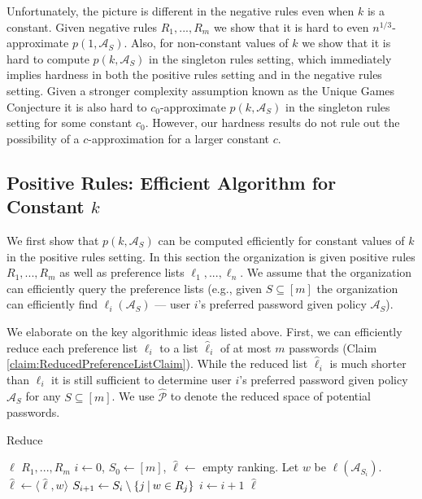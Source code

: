 \documentclass[prodmode,acmec]{ec-acmsmall}
\newcommand{\PasswordSpace}{\mathcal{P}}
\begin{document}
Unfortunately, the picture is different in the negative rules even when $k$ is a constant. Given negative rules $R_1,...,R_m$ we show that it is hard to even $n^{1/3}$-approximate $p\left(1,\mathcal{A}_S\right)$. Also, for non-constant values of $k$ we show that it is hard to compute $p\left(k,\mathcal{A}_S\right)$ in the singleton rules setting, which immediately implies hardness in both the positive rules setting and in the negative rules setting. Given a stronger complexity assumption known as the Unique Games Conjecture \cite{khot2002power} it is also hard to $c_0$-approximate $p\left(k,\mathcal{A}_S\right)$ in the singleton rules setting for some constant $c_0$. However, our hardness results do not rule out the possibility of a $c$-approximation for a larger constant $c$. 




\subsection{Positive Rules: Efficient Algorithm for Constant $k$} \label{subsec:algForConstantk}
We first show that $p\left(k,\mathcal{A}_S\right)$ can be computed efficiently for constant values of $k$ in the positive rules setting. In this section the organization is given positive rules $R_1,...,R_m$ as well as preference lists $\ell_1,...,\ell_n$. We assume that the organization can efficiently query the preference lists (e.g., given $S \subseteq [m]$ the organization can efficiently find $\ell_i\left(\mathcal{A}_S\right)$ --- user $i$'s preferred password given policy $\mathcal{A}_S$). 

We elaborate on the key algorithmic ideas listed above. First, we can efficiently reduce each preference list $\ell_i$ to a list $\hat{\ell}_i$ of at most $m$ passwords (Claim \ref{claim:ReducedPreferenceListClaim}). While the reduced list $\hat{\ell}_i$ is much shorter than $\ell_i$ it is still sufficient to determine user $i$'s preferred password given policy $\mathcal{A}_S$ for any $S \subseteq [m]$. We use $\hat{\PasswordSpace}$ to denote the reduced space of potential passwords. 

\begin{algorithm}
\caption{Reduce}
\begin{algorithmic}
 $\ell$
 $R_1,...,R_m$
  $i\gets 0$, $S_0 \gets [m]$, $\hat \ell \gets$ empty ranking.
\State Let $w$ be $\ell\left(\mathcal{A}_{S_i}\right)$.
\State $\hat{\ell} \gets \langle \hat\ell, w\rangle$
\State $S_{i+1} \gets S_i \setminus  \left\{j ~\vline~ w\in R_j\right\}$
\State $i \gets i+1$
\EndWhile
\Return $\hat{\ell}$
\end{algorithmic}
\label{alg:ReducePreferenceLists}
\end{algorithm}
\end{document}
